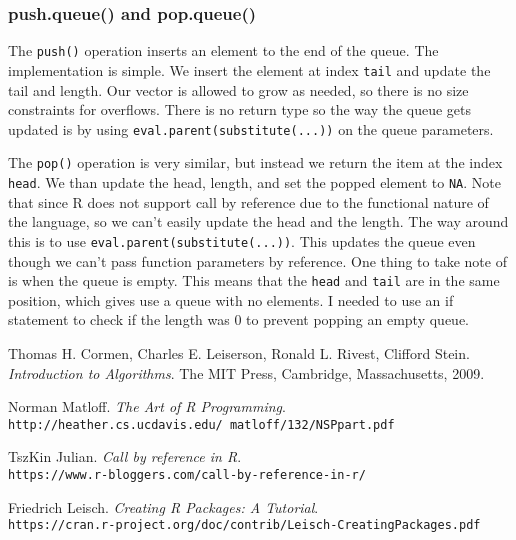 \documentclass[11pt]{article}
\begin{document}
\subsubsection{push.queue() and pop.queue()}
The {\tt push()} operation inserts an element to the end of the queue. The implementation is simple. We insert the element at index {\tt tail} and update the tail and length. Our vector is allowed to grow as needed, so there is no size constraints for overflows. There is no return type so the way the queue gets updated is by using {\tt eval.parent(substitute(...))} on the queue parameters.

The {\tt pop()} operation is very similar, but instead we return the item at the index {\tt head}. We than update the head, length, and set the popped element to {\tt NA}. Note that since R does not support call by reference due to the functional nature of the language, so we can't easily update the head and the length. The way around this is to use {\tt eval.parent(substitute(...))}. This updates the queue even though we can't pass function parameters by reference. One thing to take note of is when the queue is empty. This means that the {\tt head} and {\tt tail} are in the same position, which gives use a queue with no elements. I needed to use an if statement to check if the length was $0$ to prevent popping an empty queue.

\begin{thebibliography}{9}

Thomas H. Cormen, Charles E. Leiserson, Ronald L. Rivest, Clifford Stein.
\textit{Introduction to Algorithms}.
The MIT Press, Cambridge, Massachusetts, 2009.

Norman Matloff.
\textit{The Art of R Programming}.
\\\texttt{http://heather.cs.ucdavis.edu/~matloff/132/NSPpart.pdf}

TszKin Julian.
\textit{Call by reference in R}.
\\\texttt{https://www.r-bloggers.com/call-by-reference-in-r/}

Friedrich Leisch.
\textit{Creating R Packages: A Tutorial}.
\\\texttt{https://cran.r-project.org/doc/contrib/Leisch-CreatingPackages.pdf}

\end{thebibliography}
\end{document}
